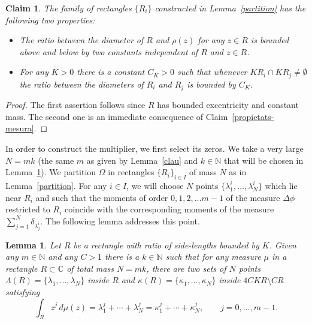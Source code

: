 \documentclass[12pt,twoside,final,psamsfonts]{amsart}
\theoremstyle{plain}
\newtheorem{lema}{Lemma}
\newtheorem{claim}{Claim}
\theoremstyle{remark}
\theoremstyle{definition}
\newcommand{\C}{{\mathbb C}}
\newcommand{\N}{{\mathbb N}}
\begin{document}
\begin{claim}\label{propietats} The family of rectangles $\{R_i\}$ constructed
in Lemma~\ref{partition} has the following two properties:
\begin{itemize}
\item The ratio between the diameter of $R$ and $\rho(z)$ for any $z\in R$ is
bounded above and below by two constants independent of $R$ and $z\in R$.
\item For any $K>0$ there is a constant $C_K>0$  such that whenever $K R_i\cap
K R_j\neq \emptyset$ the ratio between the diameters of $R_i$ and $R_j$ is
bounded by $C_K$. 
\end{itemize} 
\end{claim}
\begin{proof}
The first assertion follows since $R$ has bounded excentricity and constant
mass. The second one is an immediate consequence of 
Claim~\ref{propietats-mesura}.
\end{proof}
In order to construct the multiplier, we first select  its zeros.
We take a very large $N=mk$ (the same $m$ as given by Lemma~\ref{clau} and
$k\in\N$ that will be chosen in Lemma~\ref{moments}).  We partition 
$\Omega$ in rectangles $\{R_i\}_{i\in I}$ of mass $N$ as in
Lemma~\ref{partition}. For any $i\in I$, we will choose $N$ points 
$\{\lambda^i_1,\ldots,\lambda^i_N\}$ which lie near $R_i$ and such that the
moments of order $0,1,2,\ldots m-1$  of the measure $\Delta\phi$ restricted to
$R_i$ coincide with the corresponding moments of the measure $\sum_{j=1}^N
\delta_{\lambda^i_j}$. The following lemma addresses this point.


\begin{lema}\label{moments}
Let $R$ be a rectangle with ratio of side-lengths bounded by $K$.
Given any $m\in \N$ and any $C>1$ 
there is a $k\in \N$ such that for any measure $\mu$  in a
rectangle $R\subset \C$ of  total mass $N=mk$, there are two  sets of $N$
points  $\Lambda(R)=\{\lambda_1,\ldots,\lambda_N\}$ inside $R$
and $\kappa(R)=\{\kappa_1,\ldots,\kappa_N\}$ inside $4CKR\setminus CR$
satisfying
\[
\int_R z^j\, d\mu(z)=
\lambda_1^j+\cdots +\lambda_N^j=\kappa_1^j+\cdots+\kappa_N^j ,\qquad j=0,\ldots,m-1.
\]
\end{lema}
\end{document}
